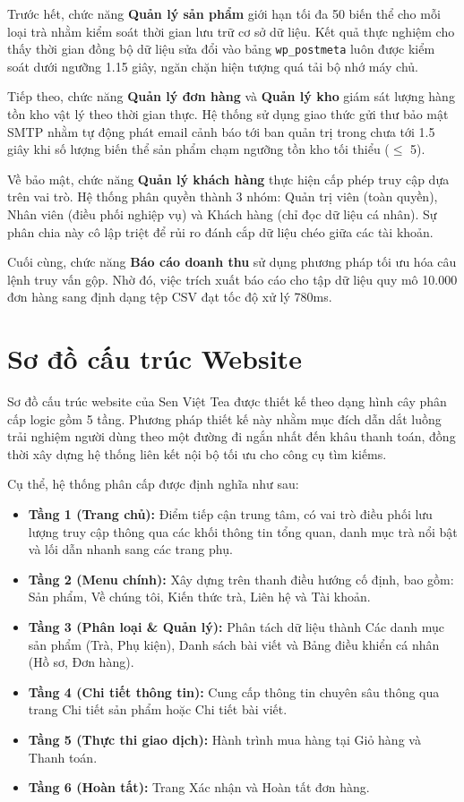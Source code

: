 Trước hết, chức năng \textbf{Quản lý sản phẩm} giới hạn tối đa 50 biến thể cho mỗi loại trà nhằm kiểm soát thời gian lưu trữ cơ sở dữ liệu. Kết quả thực nghiệm cho thấy thời gian đồng bộ dữ liệu sửa đổi vào bảng \texttt{wp\_postmeta} luôn được kiểm soát dưới ngưỡng 1.15 giây, ngăn chặn hiện tượng quá tải bộ nhớ máy chủ.

Tiếp theo, chức năng \textbf{Quản lý đơn hàng} và \textbf{Quản lý kho} giám sát lượng hàng tồn kho vật lý theo thời gian thực. Hệ thống sử dụng giao thức gửi thư bảo mật SMTP nhằm tự động phát email cảnh báo tới ban quản trị trong chưa tới 1.5 giây khi số lượng biến thể sản phẩm chạm ngưỡng tồn kho tối thiểu ($\leq$ 5).

Về bảo mật, chức năng \textbf{Quản lý khách hàng} thực hiện cấp phép truy cập dựa trên vai trò. Hệ thống phân quyền thành 3 nhóm: Quản trị viên (toàn quyền), Nhân viên (điều phối nghiệp vụ) và Khách hàng (chỉ đọc dữ liệu cá nhân). Sự phân chia này cô lập triệt để rủi ro đánh cắp dữ liệu chéo giữa các tài khoản.

Cuối cùng, chức năng \textbf{Báo cáo doanh thu} sử dụng phương pháp tối ưu hóa câu lệnh truy vấn gộp. Nhờ đó, việc trích xuất báo cáo cho tập dữ liệu quy mô 10.000 đơn hàng sang định dạng tệp CSV đạt tốc độ xử lý 780ms.

\section{Sơ đồ cấu trúc Website}

Sơ đồ cấu trúc website của Sen Việt Tea được thiết kế theo dạng hình cây phân cấp logic gồm 5 tầng. Phương pháp thiết kế này nhằm mục đích dẫn dắt luồng trải nghiệm người dùng theo một đường đi ngắn nhất đến khâu thanh toán, đồng thời xây dựng hệ thống liên kết nội bộ tối ưu cho công cụ tìm kiếms.

Cụ thể, hệ thống phân cấp được định nghĩa như sau:
\begin{itemize}
    \item \textbf{Tầng 1 (Trang chủ):} Điểm tiếp cận trung tâm, có vai trò điều phối lưu lượng truy cập thông qua các khối thông tin tổng quan, danh mục trà nổi bật và lối dẫn nhanh sang các trang phụ.
    \item \textbf{Tầng 2 (Menu chính):} Xây dựng trên thanh điều hướng cố định, bao gồm: Sản phẩm, Về chúng tôi, Kiến thức trà, Liên hệ và Tài khoản.
    \item \textbf{Tầng 3 (Phân loại \& Quản lý):} Phân tách dữ liệu thành Các danh mục sản phẩm (Trà, Phụ kiện), Danh sách bài viết và Bảng điều khiển cá nhân (Hồ sơ, Đơn hàng).
    \item \textbf{Tầng 4 (Chi tiết thông tin):} Cung cấp thông tin chuyên sâu thông qua trang Chi tiết sản phẩm hoặc Chi tiết bài viết.
    \item \textbf{Tầng 5 (Thực thi giao dịch):} Hành trình mua hàng tại Giỏ hàng và Thanh toán.
    \item \textbf{Tầng 6 (Hoàn tất):} Trang Xác nhận và Hoàn tất đơn hàng.
\end{itemize}

